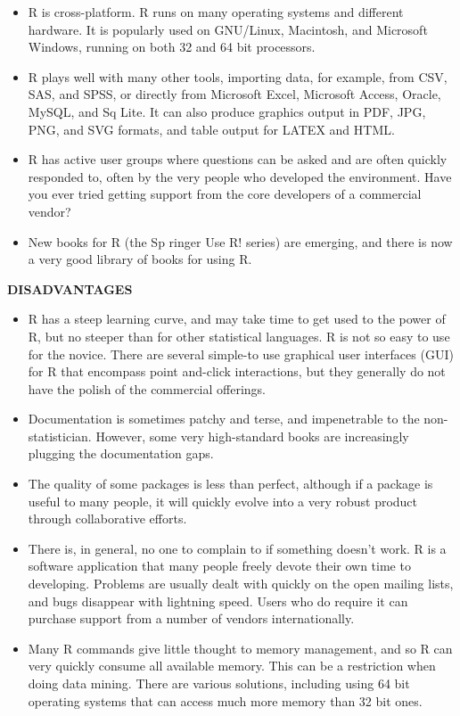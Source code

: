 \documentclass[12pt,letterpaper]{report}
\begin{document}
\begin{itemize}
\item R is cross-platform. R runs on many operating systems and different hardware. It is popularly used on GNU/Linux, Macintosh, and Microsoft Windows, running on both 32 and 64 bit processors.

\item R plays well with many other tools, importing data, for example, from CSV, SAS, and SPSS, or directly from Microsoft Excel, Microsoft Access, Oracle, MySQL, and Sq Lite. It can also produce graphics output in PDF, JPG, PNG, and SVG formats, and table output for LATEX and HTML.

\item R has active user groups where questions can be asked and are often quickly responded to, often by the very people who developed the environment. Have you ever tried getting support from the core developers of a commercial vendor?

\item New books for R (the Sp ringer Use R! series) are emerging, and there is now a very good library of books for using R.
\end{itemize}

\textbf{DISADVANTAGES}

\begin{itemize}

\item R has a steep learning curve, and may take time to get used to the power of R, but no steeper than for other statistical languages. R is not so easy to use for the novice. There are several simple-to use graphical user interfaces (GUI) for R that encompass point and-click interactions, but they generally do not have the polish of the commercial offerings.

\item Documentation is sometimes patchy and terse, and impenetrable to the non-statistician. However, some very high-standard books are increasingly plugging the documentation gaps.

\item The quality of some packages is less than perfect, although if a package is useful to many people, it will quickly evolve into a very robust product through collaborative efforts.

\item There is, in general, no one to complain to if something doesn't work. R is a software application that many people freely devote their own time to developing. Problems are usually dealt with quickly on the open mailing lists, and bugs disappear with lightning speed. Users who do require it can purchase support from a number of vendors internationally.

\item Many R commands give little thought to memory management, and so R can very quickly consume all available memory. This can be a restriction when doing data mining. There are various solutions, including using 64 bit operating systems that can access much more memory than 32 bit ones.
\end{itemize}
\end{document}
